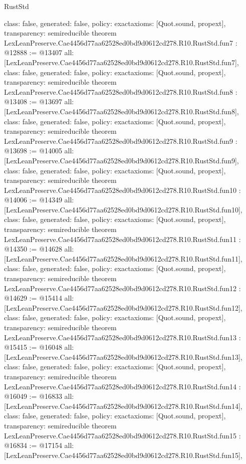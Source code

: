 \begin{lexlean}{RustStd}
\begin{coremodule}
{  class: false,
  generated: false,
  policy: exact{axioms: [Quot.sound, propext]},
  transparency: semireducible
}
theorem LexLeanPreserve.Cae4456d77aa62528ed0bd9d0612cd278.R10.RustStd.fun7 : @12888 := @13407 {
  all: [LexLeanPreserve.Cae4456d77aa62528ed0bd9d0612cd278.R10.RustStd.fun7],
  class: false,
  generated: false,
  policy: exact{axioms: [Quot.sound, propext]},
  transparency: semireducible
}
theorem LexLeanPreserve.Cae4456d77aa62528ed0bd9d0612cd278.R10.RustStd.fun8 : @13408 := @13697 {
  all: [LexLeanPreserve.Cae4456d77aa62528ed0bd9d0612cd278.R10.RustStd.fun8],
  class: false,
  generated: false,
  policy: exact{axioms: [Quot.sound, propext]},
  transparency: semireducible
}
theorem LexLeanPreserve.Cae4456d77aa62528ed0bd9d0612cd278.R10.RustStd.fun9 : @13698 := @14005 {
  all: [LexLeanPreserve.Cae4456d77aa62528ed0bd9d0612cd278.R10.RustStd.fun9],
  class: false,
  generated: false,
  policy: exact{axioms: [Quot.sound, propext]},
  transparency: semireducible
}
theorem LexLeanPreserve.Cae4456d77aa62528ed0bd9d0612cd278.R10.RustStd.fun10 : @14006 := @14349 {
  all: [LexLeanPreserve.Cae4456d77aa62528ed0bd9d0612cd278.R10.RustStd.fun10],
  class: false,
  generated: false,
  policy: exact{axioms: [Quot.sound, propext]},
  transparency: semireducible
}
theorem LexLeanPreserve.Cae4456d77aa62528ed0bd9d0612cd278.R10.RustStd.fun11 : @14350 := @14628 {
  all: [LexLeanPreserve.Cae4456d77aa62528ed0bd9d0612cd278.R10.RustStd.fun11],
  class: false,
  generated: false,
  policy: exact{axioms: [Quot.sound, propext]},
  transparency: semireducible
}
theorem LexLeanPreserve.Cae4456d77aa62528ed0bd9d0612cd278.R10.RustStd.fun12 : @14629 := @15414 {
  all: [LexLeanPreserve.Cae4456d77aa62528ed0bd9d0612cd278.R10.RustStd.fun12],
  class: false,
  generated: false,
  policy: exact{axioms: [Quot.sound, propext]},
  transparency: semireducible
}
theorem LexLeanPreserve.Cae4456d77aa62528ed0bd9d0612cd278.R10.RustStd.fun13 : @15415 := @16048 {
  all: [LexLeanPreserve.Cae4456d77aa62528ed0bd9d0612cd278.R10.RustStd.fun13],
  class: false,
  generated: false,
  policy: exact{axioms: [Quot.sound, propext]},
  transparency: semireducible
}
theorem LexLeanPreserve.Cae4456d77aa62528ed0bd9d0612cd278.R10.RustStd.fun14 : @16049 := @16833 {
  all: [LexLeanPreserve.Cae4456d77aa62528ed0bd9d0612cd278.R10.RustStd.fun14],
  class: false,
  generated: false,
  policy: exact{axioms: [Quot.sound, propext]},
  transparency: semireducible
}
theorem LexLeanPreserve.Cae4456d77aa62528ed0bd9d0612cd278.R10.RustStd.fun15 : @16834 := @17154 {
  all: [LexLeanPreserve.Cae4456d77aa62528ed0bd9d0612cd278.R10.RustStd.fun15],
}
\end{coremodule}
\end{lexlean}
